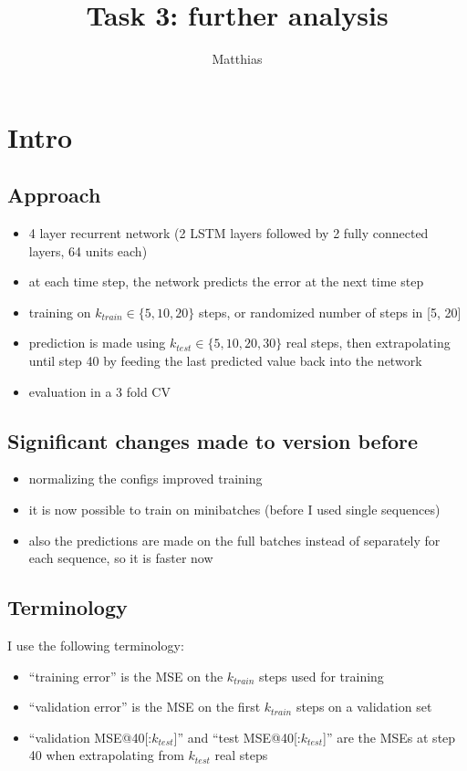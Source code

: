 \documentclass[a4paper,10pt]{article}
\title{Task 3: further analysis}
\author{Matthias}
\begin{document}
\maketitle

\section{Intro}

\subsection{Approach}

\begin{itemize}
 \item 4 layer recurrent network (2 LSTM layers followed by 2 fully connected layers, 64 units each)
 \item at each time step, the network predicts the error at the next time step
 \item training on $k_{train} \in \{5, 10, 20\}$ steps, or randomized number of steps in [5, 20]
 \item prediction is made using $k_{test} \in \{5, 10, 20, 30\}$ real steps, then extrapolating until step 40 by feeding the last predicted value back into the network
 \item evaluation in a 3 fold CV
\end{itemize}

\subsection{Significant changes made to version before}

\begin{itemize}
 \item normalizing the configs improved training
 \item it is now possible to train on minibatches (before I used single sequences)
 \item also the predictions are made on the full batches instead of separately for each sequence, so it is faster now
\end{itemize}


\subsection{Terminology}

I use the following terminology:
\begin{itemize}
 \item ``training error'' is the MSE on the $k_{train}$ steps used for training
 \item ``validation error'' is the MSE on the first $k_{train}$ steps on a validation set
 \item ``validation MSE@40[:$k_{test}$]'' and ``test MSE@40[:$k_{test}$]''
    are the MSEs at step 40 when extrapolating from $k_{test}$ real steps
\end{itemize}
\end{document}
